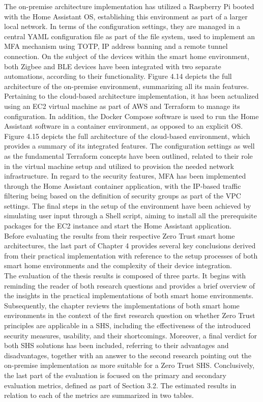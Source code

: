 The on-premise architecture implementation has utilized a Raspberry Pi booted with the Home Assistant OS, establishing this environment as part of a larger local network. In terms of the configuration settings, they are managed in a central YAML configuration file as part of the file system, used to implement an MFA mechanism using TOTP, IP address banning and a remote tunnel connection. On the subject of the devices within the smart home environment, both Zigbee and BLE devices have been integrated with two separate automations, according to their functionality. Figure 4.14 depicts the full architecture of the on-premise environment, summarizing all its main features.\\
Pertaining to the cloud-based architecture implementation, it has been actualized using an EC2 virtual machine as part of AWS and Terraform to manage its configuration. In addition, the Docker Compose software is used to run the Home Assistant software in a container environment, as opposed to an explicit OS. Figure 4.15 depicts the full architecture of the cloud-based environment, which provides a summary of its integrated features. The configuration settings as well as the fundamental Terraform concepts have been outlined, related to their role in the virtual machine setup and utilized to provision the needed network infrastructure. In regard to the security features, MFA has been implemented through the Home Assistant container application, with the IP-based traffic filtering being based on the definition of security groups as part of the VPC settings. The final steps in the setup of the environment have been achieved by simulating user input through a Shell script, aiming to install all the prerequisite packages for the EC2 instance and start the Home Assistant application.\\
Before evaluating the results from their respective Zero Trust smart home architectures, the last part of Chapter 4 provides several key conclusions derived from their practical implementation with reference to the setup processes of both smart home environments and the complexity of their device integration.\\
The evaluation of the thesis results is composed of three parts. It begins with reminding the reader of both research questions and provides a brief overview of the insights in the practical implementations of both smart home environments. Subsequently, the chapter reviews the implementations of both smart home environments in the context of the first research question on whether Zero Trust principles are applicable in a SHS, including the effectiveness of the introduced security measures, usability, and their shortcomings. Moreover, a final verdict for both SHS solutions has been included, referring to their advantages and disadvantages, together with an answer to the second research pointing out the on-premise implementation as more suitable for a Zero Trust SHS. Conclusively, the last part of the evaluation is focused on the primary and secondary evaluation metrics, defined as part of Section 3.2. The estimated results in relation to each of the metrics are summarized in two tables.

